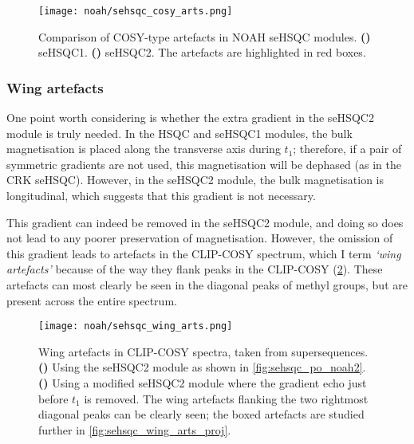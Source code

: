 \begin{figure}[!ht]
    \centering
    \texttt{[image: noah/sehsqc\_cosy\_arts.png]}%
    {\label{fig:sehsqc_cosy_arts_1}}%
    {\label{fig:sehsqc_cosy_arts_2}}%
    \caption[Comparison of COSY-type artefacts in NOAH seHSQC modules]{
        Comparison of COSY-type artefacts in NOAH seHSQC modules.
        \textbf{()} seHSQC1.
        \textbf{()} seHSQC2. The artefacts are highlighted in red boxes.
    }
    \label{fig:sehsqc_cosy_arts}
\end{figure}


\subsubsection{Wing artefacts}

One point worth considering is whether the extra gradient in the seHSQC2 module is truly needed.
In the HSQC and seHSQC1 modules, the bulk magnetisation is placed along the transverse axis during $t_1$; therefore, if a pair of symmetric gradients are not used, this magnetisation will be dephased (as in the CRK seHSQC).
However, in the seHSQC2 module, the bulk magnetisation is longitudinal, which suggests that this gradient is not necessary.

This gradient can indeed be removed in the seHSQC2 module, and doing so does not lead to any poorer preservation of  magnetisation.
However, the omission of this gradient leads to artefacts in the CLIP-COSY spectrum, which I term \textit{`wing artefacts'} because of the way they flank peaks in the CLIP-COSY (\cref{fig:sehsqc_wing_arts}).
These artefacts can most clearly be seen in the diagonal peaks of methyl groups, but are present across the entire spectrum.

\begin{figure}[!ht]
    \centering
    \texttt{[image: noah/sehsqc\_wing\_arts.png]}%
    {\label{fig:sehsqc_wing_arts_2grad}}%
    {\label{fig:sehsqc_wing_arts_1grad}}%
    \caption[Wing artefacts in CLIP-COSY spectra when extra seHSQC2 gradient is omitted]{
        Wing artefacts in CLIP-COSY spectra, taken from  supersequences.
        \textbf{()} Using the seHSQC2 module as shown in \cref{fig:sehsqc_po_noah2}.
        \textbf{()} Using a modified seHSQC2 module where the gradient echo just before $t_1$ is removed.
        The wing artefacts flanking the two rightmost diagonal peaks can be clearly seen; the boxed artefacts are studied further in \cref{fig:sehsqc_wing_arts_proj}.
    }
    \label{fig:sehsqc_wing_arts}
\end{figure}

